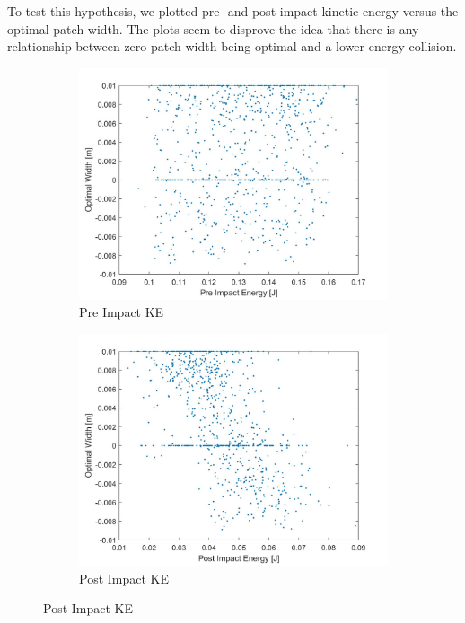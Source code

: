 \documentclass{article}
\begin{document}
\noindent To test this hypothesis, we plotted pre- and post-impact kinetic energy versus the optimal patch width. The plots seem to disprove the idea that there is any relationship between zero patch width being optimal and a lower energy collision. 

\begin{figure}[ht]
    \caption{Kinetic Energy Analysis}
    \centering
    \begin{subfigure}[b]{0.45\linewidth}
        \includegraphics[scale=0.12]{preImpactEnergy.jpg}
        \caption{Pre Impact KE}
        \label{fig:preKE}
    \end{subfigure}
    \quad
    \begin{subfigure}[b]{0.45\linewidth}
       \includegraphics[scale=0.12]{postImpactEnergy.jpg}
        \caption{Post Impact KE}
        \label{fig:postKE}
    \end{subfigure}
\end{figure}
\end{document}
